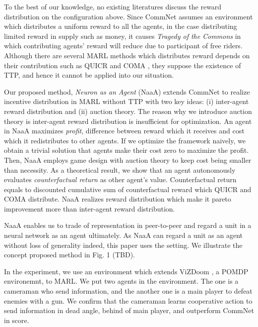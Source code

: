 To the best of our knowledge, no existing literatures discuss the reward distribution on the configuration above.
Since CommNet assumes an environment which distributes a uniform reward to all the agents, 
in the case distributing limited reward in supply such as money, it causes {\em Tragedy of the Commons} \citep{lloyd1833two} in which contributing agents' reward will reduce due to participant of free riders.
Although there are several MARL methods which distributes reward depends on their contribution such as QUICR \citep{agogino2006quicr} and COMA \citep{sukhbaatar2016learning}, they suppose the existence of TTP, and hence it cannot be applied into our situation.


Our proposed method, {\em Neuron as an Agent} (NaaA) extends CommNet to realize incentive distribution
in MARL without TTP with two key ideas: (i) inter-agent reward distribution and (ii) auction theory.
The reason why we introduce auction theory is inter-agent reward distribution is insufficient for optimization.
An agent in NaaA maximizes {\em profit}, difference between reward which it receives and cost which it redistributes to other agents.
If we optimize the framework naively, we obtain a trivial solution that agents make their cost zero to maximize the profit.
Then, NaaA employs game design with auction theory to keep cost being smaller than necessity.
As a theoretical result, we show that an agent autonomously evaluates {\em counterfactual return} as other agent's value.
Counterfactual return equals to discounted cumulative sum of counterfactual reward \citep{agogino2006quicr} which QUICR and COMA distribute.
NaaA realizes reward distribution which make it pareto improvement more than inter-agent reward distribution.

NaaA enables us to trade of representation in peer-to-peer and regard a unit in a neural network as an agent ultimately.
As NaaA can regard a unit as an agent without loss of generality indeed, this paper uses the setting.
We illustrate the concept proposed method in Fig. 1 (TBD).

In the experiment, we use an environment which extends ViZDoom \citep{kempka2016vizdoom}, a POMDP environemnt, to MARL.
We put two agents in the environment.
The one is a cameraman who send information, and the another one is a main player to defeat enemies with a gun.
We confirm that the cameraman learns cooperative action to send information in dead angle, behind of main player, and outperform CommNet in score.

